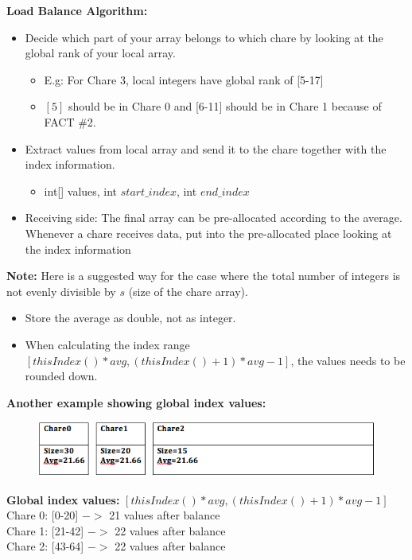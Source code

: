 \documentclass{article}
\begin{document}
\textbf{ Load Balance Algorithm: }
\begin{itemize}
\item Decide which part of your array belongs to which chare by looking at the global rank of your local array.
\begin{itemize}
\item E.g: For Chare 3, local integers have global rank of [5-17]
\item $[5]$ should be in Chare 0 and [6-11] should be in Chare 1 because of FACT \#2.
\end{itemize}
\item Extract values from local array and send it to the chare together with the index information. 
\begin{itemize}
\item int[] values, int $start\_index$, int $end\_index$
\end{itemize}


\item Receiving side: The final array can be pre-allocated according to the average. Whenever a chare receives data, put into the pre-allocated place looking at the index information

\end{itemize}



\textbf{Note:}
Here is a suggested way for the case where the total number of integers is not
evenly divisible by $s$ (size of the chare array).
\begin{itemize}
\item Store the average as double, not as integer.
\item When calculating the index range $[thisIndex()*avg, (thisIndex()+1)*avg-1]$, the values needs to be rounded down.\\
\end{itemize}


\textbf{Another example showing global index values:}

\begin{figure}[h]
\centering
\includegraphics[width=\textwidth]{example.png}
\label{prefix}
\end{figure}
\textbf{Global index values:} $[thisIndex()*avg, (thisIndex()+1)*avg-1]$\\
Chare 0: [0-20] $->$ 21 values after balance\\
Chare 1: [21-42] $->$ 22 values after balance\\
Chare 2: [43-64] $->$ 22 values after balance\\
\end{document}
